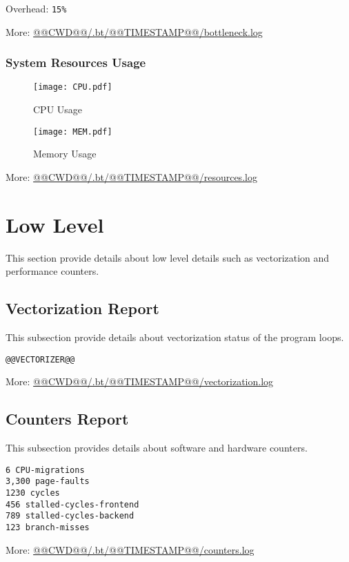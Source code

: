 \documentclass[a4paper]{article}
\begin{document}
Overhead: {\tt 15\%}

More: \href{@@CWD@@/.bt/@@TIMESTAMP@@/scalability.log}{@@CWD@@/.bt/@@TIMESTAMP@@/bottleneck.log}

\subsubsection{System Resources Usage}

\begin{figure}[H]
\label{fig:normal}
\centering
\texttt{[image: CPU.pdf]}
\caption{CPU Usage}
\end{figure}

\begin{figure}[H]
\label{fig:normal}
\centering
\texttt{[image: MEM.pdf]}
\caption{Memory Usage}
\end{figure}

More: \href{@@CWD@@/.bt/@@TIMESTAMP@@/scalability.log}{@@CWD@@/.bt/@@TIMESTAMP@@/resources.log}

\section{Low Level}

This section provide details about low level details such as vectorization and performance counters.

\subsection{Vectorization Report}

This subsection provide details about vectorization status of the program loops.

\begin{verbatim}
@@VECTORIZER@@
\end{verbatim}

More: \href{@@CWD@@/.bt/@@TIMESTAMP@@/scalability.log}{@@CWD@@/.bt/@@TIMESTAMP@@/vectorization.log}

\subsection{Counters Report}

This subsection provides details about software and hardware counters.

\begin{verbatim}
6 CPU-migrations
3,300 page-faults
1230 cycles
456 stalled-cycles-frontend
789 stalled-cycles-backend
123 branch-misses
\end{verbatim}

More: \href{@@CWD@@/.bt/@@TIMESTAMP@@/scalability.log}{@@CWD@@/.bt/@@TIMESTAMP@@/counters.log}
\end{document}
